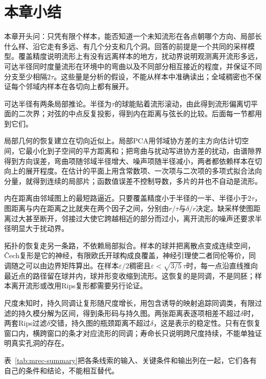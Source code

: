 \section{本章小结}
\label{sec:mrec-summary}

本章开头问：只凭有限个样本，能否知道一个未知流形在各点朝哪个方向、局部长什么样、沿它走有多远、有几个分支和几个洞。回答的前提是一个共同的采样模型。覆盖精度说明流形上有没有远离样本的地方，扰动界说明观测离开流形多远，可达半径同时度量流形在环境中的弯曲以及不同部分相互接近的程度，并保证不同分支至少相隔$2\tau$。这些量是分析的假设，不能从样本中准确读出；全域稠密也不保证每个邻域内样本在各切向上都有展开。

可达半径有两条局部推论。半径为$\tau$的球能贴着流形滚动，由此得到流形偏离切平面的二次界；对弦的中点反复投影，得到内在距离与弦长的比较。后面每一节都用到它们。

局部几何的恢复建立在切向近似上。局部PCA用邻域协方差的主方向估计切空间，它最小化到子空间的平方距离和；把弯曲与扰动写进协方差的扰动，由谱隙界得到方向误差，弯曲项随邻域半径增大、噪声项随半径减小，两者都依赖样本在切向上的展开程度。在估计的平面上用含常数项、一次项与二次项的多项式拟合法向分量，就得到连续的局部片；函数值误差不控制导数，多片的并也不自动是流形。

内在距离由邻域图上的最短路逼近。只要覆盖精度小于半径的一半、半径小于$2\tau$，图距离与内在距离之比就夹在两个因子之间，分别由$r/\tau$与$\delta/r$决定。缺采样使图距离过大甚至断开，邻接过大使它跨越相近的部分而过小，离开流形的噪声还要求半径明显大于扰动界。

拓扑的恢复走另一条路，不依赖局部拟合。样本的球并把离散点变成连续空间，Čech复形是它的神经，有限欧氏开球构成良覆盖，神经引理使二者同伦等价，同调随之可以由边界矩阵算出。在样本$\varepsilon/2$稠密且$\varepsilon<\sqrt{3/5}\,\tau$时，每一点沿直线推向最近点的路径留在球并内，球并形变收缩到流形。这恢复的是同调，不是同胚；样本离开流形或改用Rips复形都需要另行论证。

尺度未知时，持久同调让复形随尺度增长，用包含诱导的映射追踪同调类，有限过滤的持久模分解为区间，得到条形码与持久图。两张距离表逐项相差不超过$\delta$时，两套Rips过滤$\delta$交错，持久图的瓶颈距离不超过$\delta$，这是表示的稳定性。只有在恢复窗口内，横跨窗口的条才对应流形的同调；寿命长只说明跨尺度持续，不能单独证明真实孔洞的存在。

表~\ref{tab:mrec-summary}把各条线索的输入、关键条件和输出列在一起，它们各有自己的条件和结论，不能相互替代。

